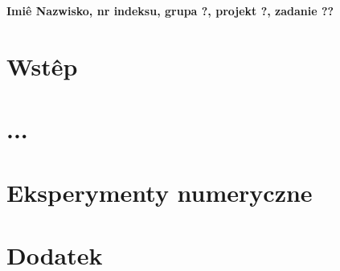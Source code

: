 \documentclass[a4paper,12pt]{article}
\begin{document}
\def\tablename{Tabela} %


\noindent
\textbf{Imiê Nazwisko, nr indeksu, grupa ?, projekt ?, zadanie ??}


\section*{Wstêp} %


\section*{...}


\section*{Eksperymenty numeryczne}


\section*{Dodatek}
\end{document}
